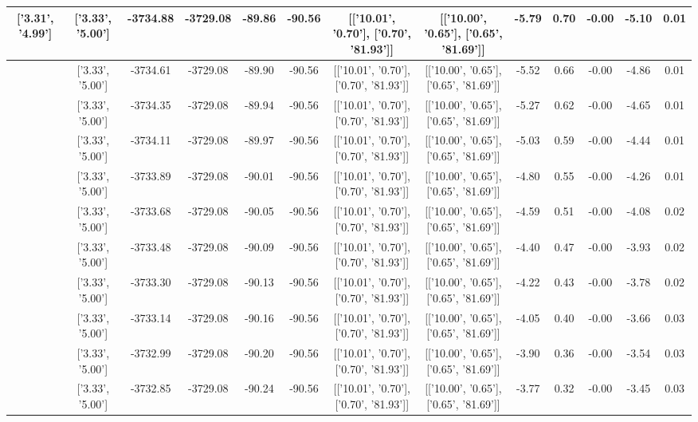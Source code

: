 \begin{table}[htbp]
\begin{adjustbox}{angle=90}
\begin{tabular}{|c|c|c|c|c|c|c|c|c|c|c|c|c|}
 ['3.31', '4.99'] & ['3.33', '5.00'] & -3734.88 & -3729.08 & -89.86 & -90.56 & [['10.01', '0.70'], ['0.70', '81.93']] & [['10.00', '0.65'], ['0.65', '81.69']] & -5.79 & 0.70 & -0.00 & -5.10 & 0.01\\ \hline
 ['3.31', '4.99'] & ['3.33', '5.00'] & -3734.61 & -3729.08 & -89.90 & -90.56 & [['10.01', '0.70'], ['0.70', '81.93']] & [['10.00', '0.65'], ['0.65', '81.69']] & -5.52 & 0.66 & -0.00 & -4.86 & 0.01\\ \hline
 ['3.31', '4.99'] & ['3.33', '5.00'] & -3734.35 & -3729.08 & -89.94 & -90.56 & [['10.01', '0.70'], ['0.70', '81.93']] & [['10.00', '0.65'], ['0.65', '81.69']] & -5.27 & 0.62 & -0.00 & -4.65 & 0.01\\ \hline
 ['3.31', '4.99'] & ['3.33', '5.00'] & -3734.11 & -3729.08 & -89.97 & -90.56 & [['10.01', '0.70'], ['0.70', '81.93']] & [['10.00', '0.65'], ['0.65', '81.69']] & -5.03 & 0.59 & -0.00 & -4.44 & 0.01\\ \hline
 ['3.31', '4.99'] & ['3.33', '5.00'] & -3733.89 & -3729.08 & -90.01 & -90.56 & [['10.01', '0.70'], ['0.70', '81.93']] & [['10.00', '0.65'], ['0.65', '81.69']] & -4.80 & 0.55 & -0.00 & -4.26 & 0.01\\ \hline
 ['3.31', '4.99'] & ['3.33', '5.00'] & -3733.68 & -3729.08 & -90.05 & -90.56 & [['10.01', '0.70'], ['0.70', '81.93']] & [['10.00', '0.65'], ['0.65', '81.69']] & -4.59 & 0.51 & -0.00 & -4.08 & 0.02\\ \hline
 ['3.32', '4.99'] & ['3.33', '5.00'] & -3733.48 & -3729.08 & -90.09 & -90.56 & [['10.01', '0.70'], ['0.70', '81.93']] & [['10.00', '0.65'], ['0.65', '81.69']] & -4.40 & 0.47 & -0.00 & -3.93 & 0.02\\ \hline
 ['3.32', '5.00'] & ['3.33', '5.00'] & -3733.30 & -3729.08 & -90.13 & -90.56 & [['10.01', '0.70'], ['0.70', '81.93']] & [['10.00', '0.65'], ['0.65', '81.69']] & -4.22 & 0.43 & -0.00 & -3.78 & 0.02\\ \hline
 ['3.32', '5.00'] & ['3.33', '5.00'] & -3733.14 & -3729.08 & -90.16 & -90.56 & [['10.01', '0.70'], ['0.70', '81.93']] & [['10.00', '0.65'], ['0.65', '81.69']] & -4.05 & 0.40 & -0.00 & -3.66 & 0.03\\ \hline
 ['3.32', '5.00'] & ['3.33', '5.00'] & -3732.99 & -3729.08 & -90.20 & -90.56 & [['10.01', '0.70'], ['0.70', '81.93']] & [['10.00', '0.65'], ['0.65', '81.69']] & -3.90 & 0.36 & -0.00 & -3.54 & 0.03\\ \hline
 ['3.32', '5.00'] & ['3.33', '5.00'] & -3732.85 & -3729.08 & -90.24 & -90.56 & [['10.01', '0.70'], ['0.70', '81.93']] & [['10.00', '0.65'], ['0.65', '81.69']] & -3.77 & 0.32 & -0.00 & -3.45 & 0.03\\ \hline

\end{tabular}
\end{adjustbox}
\end{table}
